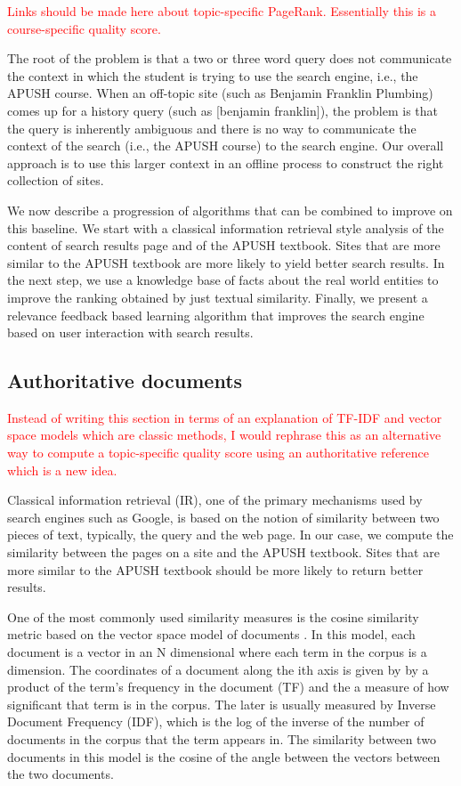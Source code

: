 \documentclass{acm_proc_article-sp}
\begin{document}
\textcolor{red}{Links should be made here about topic-specific
  PageRank. Essentially this is a course-specific quality score.}

The root of the problem is that a two or three word query does not communicate
the context in which the student is trying to use the search engine, i.e., the
APUSH course.  When an off-topic site (such as Benjamin Franklin Plumbing) comes
up for a history query (such as [benjamin franklin]), the problem is that the
query is inherently ambiguous and there is no way to communicate the context of
the search (i.e., the APUSH course) to the search engine.  Our overall approach
is to use this larger context in an offline process to construct the right
collection of sites. 

We now describe a progression of algorithms that can be combined to improve on
this baseline. We start with a classical information retrieval style analysis of
the content of search results page and of the APUSH textbook. Sites that are
more similar to the APUSH textbook are more likely to yield better search
results. In the next step, we use a knowledge base of facts about the real world
entities to improve the ranking obtained by just textual similarity. Finally, we
present a relevance feedback based learning algorithm that improves the search
engine based on user interaction with search results. 

\subsection{Authoritative documents}

\textcolor{red}{Instead of writing this section in terms of an explanation of
  TF-IDF and vector space models which are classic methods, I would rephrase this
  as an alternative way to compute a topic-specific quality score using an
  authoritative reference which is a new idea.}

Classical information retrieval (IR), one of the primary mechanisms used by
search engines such as Google, is based on the notion of similarity between two
pieces of text, typically, the query and the web page.  In our case, we compute
the similarity between the pages on a site and the APUSH textbook. Sites that
are more similar to the APUSH textbook should  be more likely to return better
results. 

One of the most commonly used similarity measures is the cosine similarity
metric based on the vector space model of documents \cite{salton1975vector}. In
this model, each document is a vector in an N dimensional where each term in the
corpus is a dimension. The coordinates of a document along the ith axis is given by by a
product of the term's frequency in the document (TF) and the a measure of how
significant that term is in the corpus. The later is usually measured by Inverse
Document Frequency (IDF), which is the log of the inverse of the number of
documents in the corpus that the term appears in. The similarity between two
documents in this model is the cosine of the angle between the vectors between
the two documents. 
\end{document}
